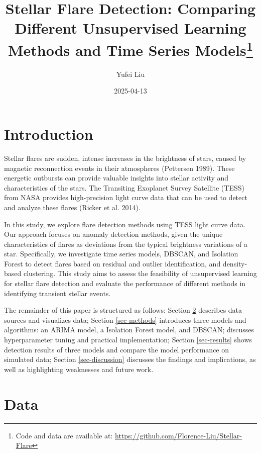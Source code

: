 \documentclass[
]{article}
\title{Stellar Flare Detection: Comparing Different Unsupervised Learning Methods and Time Series Models\thanks{Code and data are available at: \url{https://github.com/Florence-Liu/Stellar-Flare}}}
\author{Yufei Liu}
\date{2025-04-13}
\begin{document}
\maketitle

\section{Introduction}\label{introduction}

Stellar flares are sudden, intense increases in the brightness of stars, caused by magnetic reconnection events in their atmospheres (Pettersen 1989). These energetic outbursts can provide valuable insights into stellar activity and characteristics of the stars. The Transiting Exoplanet Survey Satellite (TESS) from NASA provides high-precision light curve data that can be used to detect and analyze these flares (Ricker et al. 2014).

In this study, we explore flare detection methods using TESS light curve data. Our approach focuses on anomaly detection methods, given the unique characteristics of flares as deviations from the typical brightness variations of a star. Specifically, we investigate time series models, DBSCAN, and Isolation Forest to detect flares based on residual and outlier identification, and density-based clustering. This study aims to assess the feasibility of unsupervised learning for stellar flare detection and evaluate the performance of different methods in identifying transient stellar events.

The remainder of this paper is structured as follows: Section \ref{sec-data} describes data sources and visualizes data; Section \ref{sec-methods} introduces three models and algorithms: an ARIMA model, a Isolation Forest model, and DBSCAN; discusses hyperparameter tuning and practical implementation; Section \ref{sec-results} shows detection results of three models and compare the model performance on simulated data; Section \ref{sec-discussion} discusses the findings and implications, as well as highlighting weaknesses and future work.

\section{Data}\label{sec-data}
\end{document}
